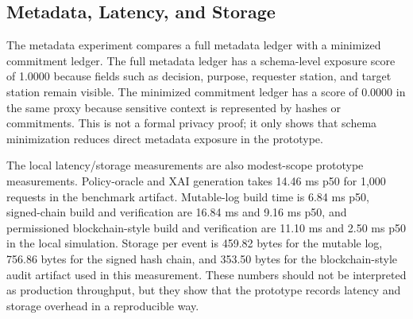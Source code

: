 \subsection{Metadata, Latency, and Storage}

The metadata experiment compares a full metadata ledger with a minimized
commitment ledger. The full metadata ledger has a schema-level exposure score
of 1.0000 because fields such as decision, purpose, requester station, and
target station remain visible. The minimized commitment ledger has a score of
0.0000 in the same proxy because sensitive context is represented by hashes or
commitments. This is not a formal privacy proof; it only shows that schema
minimization reduces direct metadata exposure in the prototype.

The local latency/storage measurements are also modest-scope prototype
measurements. Policy-oracle and XAI generation takes 14.46 ms p50 for 1,000
requests in the benchmark artifact. Mutable-log build time is 6.84 ms p50,
signed-chain build and verification are 16.84 ms and 9.16 ms p50, and
permissioned blockchain-style build and verification are 11.10 ms and 2.50 ms
p50 in the local simulation. Storage per event is 459.82 bytes for the mutable
log, 756.86 bytes for the signed hash chain, and 353.50 bytes for the
blockchain-style audit artifact used in this measurement. These numbers should
not be interpreted as production throughput, but they show that the prototype
records latency and storage overhead in a reproducible way.
